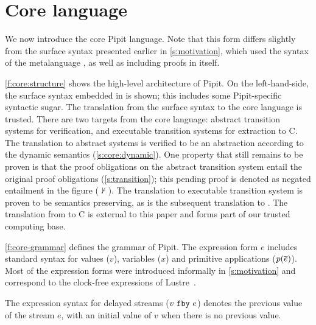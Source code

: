 
\section{Core language}
\label{s:core}



We now introduce the core Pipit language.
Note that this form differs slightly from the surface syntax presented earlier in \autoref{s:motivation}, which used the syntax of the metalanguage \fstar{}, as well as including proofs in \fstar{} itself.


\autoref{f:core:structure} shows the high-level architecture of Pipit.
On the left-hand-side, the surface syntax embedded in \fstar{} is shown; this includes some Pipit-specific syntactic sugar.
The translation from the surface syntax to the core language is trusted.
There are two targets from the core language: abstract transition systems for verification, and executable transition systems for extraction to C.
The translation to abstract systems is verified to be an abstraction according to the dynamic semantics (\autoref{s:core:dynamic}).
One property that still remains to be proven is that the proof obligations on the abstract transition system entail the original proof obligations (\autoref{s:transition}); this pending proof is denoted as negated entailment in the figure ($\not\vdash$).
The translation to executable transition system is proven to be semantics preserving, as is the subsequent translation to \lowstar{}.
The translation from \lowstar{} to C is external to this paper and forms part of our trusted computing base.


\autoref{f:core-grammar} defines the grammar of Pipit.
The expression form $e$ includes standard syntax for values ($v$), variables ($x$) and primitive applications ($p(\overline{e})$).
Most of the expression forms were introduced informally in \autoref{s:motivation} and correspond to the clock-free expressions of Lustre~\cite{caspi1995functional}.



The expression syntax for delayed streams ($v~\texttt{fby}~e$) denotes the previous value of the stream $e$, with an initial value of $v$ when there is no previous value.

